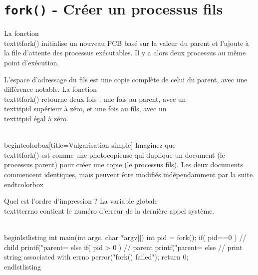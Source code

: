 \documentclass[12pt]{article}
\begin{document}
\section{\texttt{fork()} - Créer un processus fils}

La fonction \\texttt{fork()} initialise un nouveau PCB basé sur la valeur du parent et l'ajoute à la file d'attente des processus exécutables. Il y a alors deux processus au même point d'exécution.

L'espace d'adressage du fils est une copie complète de celui du parent, avec une différence notable. La fonction \\texttt{fork()} retourne deux fois : une fois au parent, avec un \\texttt{pid} supérieur à zéro, et une fois au fils, avec un \\texttt{pid} égal à zéro.

\\begin{tcolorbox}[title={Vulgarisation simple}]
Imaginez que \\texttt{fork()} est comme une photocopieuse qui duplique un document (le processus parent) pour créer une copie (le processus fils). Les deux documents commencent identiques, mais peuvent être modifiés indépendamment par la suite.
\\end{tcolorbox}

Quel est l'ordre d'impression ? La variable globale \\texttt{errno} contient le numéro d'erreur de la dernière appel système.

\\begin{lstlisting}
int main(int argc, char *argv[])
{
    int pid = fork();
    if( pid==0 ) {
        // child
        printf("parent=%d son=%dn", getppid(), getpid());
    }
    else if( pid > 0 ) {
        // parent
        printf("parent=%d son=%dn", getpid(), pid);
    }
    else { // print string associated with errno
        perror("fork() failed");
    }
    return 0;
}
\\end{lstlisting}

\
\end{document}
